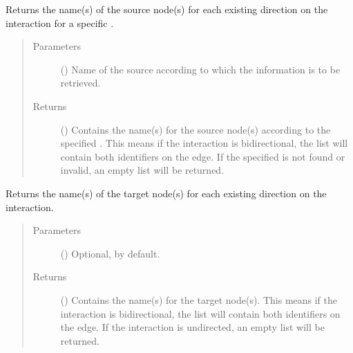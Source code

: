 \documentclass[letterpaper,10pt,english]{sphinxmanual}
\begin{document}
\begin{fulllineitems}
\begin{fulllineitems}
\label{\detokenize{reference:pypath.main.Direction.src_by_source}}
Returns the name(s) of the source node(s) for each existing
direction on the interaction for a specific .
\begin{quote}\begin{description}
\item[{Parameters}] \leavevmode
{} () \textendash{} Name of the source according to which the information is to
be retrieved.

\item[{Returns}] \leavevmode
() \textendash{} Contains the name(s) for the source node(s)
according to the specified . This means if the
interaction is bidirectional, the list will contain both
identifiers on the edge. If the specified  is not
found or invalid, an empty list will be returned.

\end{description}\end{quote}

\end{fulllineitems}


\begin{fulllineitems}
\label{\detokenize{reference:pypath.main.Direction.tgt}}
Returns the name(s) of the target node(s) for each existing
direction on the interaction.
\begin{quote}\begin{description}
\item[{Parameters}] \leavevmode
{} () \textendash{} Optional,  by default.

\item[{Returns}] \leavevmode
() \textendash{} Contains the name(s) for the target node(s).
This means if the interaction is bidirectional, the list
will contain both identifiers on the edge. If the
interaction is undirected, an empty list will be returned.


\end{description}
\end{quote}
\end{fulllineitems}
\end{fulllineitems}
\end{document}
